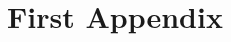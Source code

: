 \setcounter{figure}{0}
\setcounter{listing}{0}

\chapter{First Appendix \label{cha:chapter1} }

\begin{refsegment}

% 


\end{refsegment}